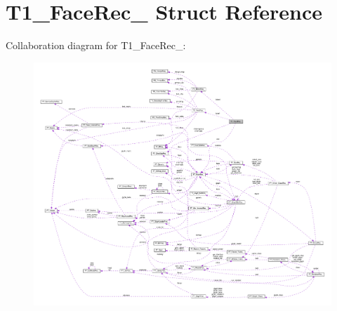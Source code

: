 \hypertarget{structT1__FaceRec__}{}\section{T1\+\_\+\+Face\+Rec\+\_\+ Struct Reference}
\label{structT1__FaceRec__}


Collaboration diagram for T1\+\_\+\+Face\+Rec\+\_\+\+:
\nopagebreak
\begin{figure}[H]
\begin{center}
\leavevmode
\includegraphics[width=350pt]{structT1__FaceRec____coll__graph}
\end{center}
\end{figure}
